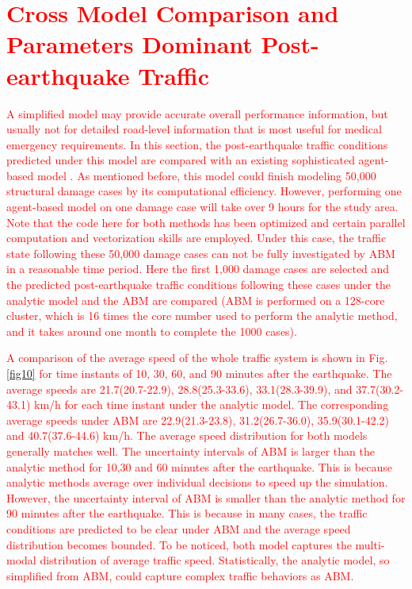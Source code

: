 \documentclass[review,11pt,nonatbib]{elsarticle}
\begin{document}
\section{\textcolor{red}{Cross Model Comparison and Parameters Dominant Post-earthquake Traffic}}
\textcolor{red}{A simplified model may provide accurate overall performance information, but usually not for detailed road-level information that is most useful for medical emergency requirements. In this section, the post-earthquake traffic conditions predicted under this model are compared with an existing  sophisticated agent-based model \citep{feng2017post}. As mentioned before, this model could finish modeling 50,000 structural damage cases by its computational efficiency. However, performing one agent-based model on one damage case will take over 9 hours for the study area. Note that the code here for both methods has been optimized and certain parallel computation and vectorization skills are employed. Under this case, the traffic state following these 50,000 damage cases can not be fully investigated by ABM in a reasonable time period. Here the first 1,000 damage cases are selected and the predicted post-earthquake traffic conditions following these cases under the analytic model and the ABM are compared (ABM is performed on a 128-core cluster, which is 16 times the core number used to perform the analytic method, and it takes around one month to complete the 1000 cases).}

\textcolor{red}{ A comparison of the average speed of the whole traffic system is shown in Fig. \ref{fig10} for time instants of 10, 30, 60, and 90 minutes after the earthquake. The average speeds are 21.7(20.7-22.9), 28.8(25.3-33.6), 33.1(28.3-39.9), and 37.7(30.2-43.1) km/h for each time instant under the analytic model. The corresponding average speeds under ABM are 22.9(21.3-23.8), 31.2(26.7-36.0), 35.9(30.1-42.2) and 40.7(37.6-44.6) km/h. The average speed distribution for both models generally matches well. The uncertainty intervals of ABM is larger than the analytic method for 10,30 and 60 minutes after the earthquake. This is because analytic methods average over individual decisions to speed up the simulation. However, the uncertainty interval of ABM is smaller than the analytic method for 90 minutes after the earthquake. This is because in many cases, the traffic conditions are predicted to be clear under ABM and the average speed distribution becomes bounded. To be noticed, both model captures the multi-modal distribution of average traffic speed. Statistically, the analytic model, so simplified from ABM, could capture complex traffic behaviors as ABM.}
\end{document}
